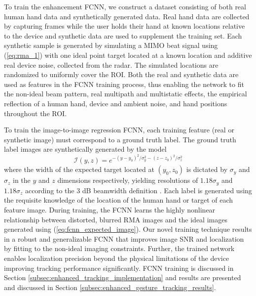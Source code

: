 \documentclass[10pt,journal,final]{IEEEtran}
\begin{document}
To train the enhancement FCNN, we construct a dataset consisting of both real human hand data and synthetically generated data.
Real hand data are collected by capturing frames while the user holds their hand at known locations relative to the device and synthetic data are used to supplement the training set. 
Each synthetic sample is generated by simulating a MIMO beat signal using (\ref{eq:rma_1}) with one ideal point target located at a known location and additive real device noise, collected from the radar. 
The simulated locations are randomized to uniformly cover the ROI.
Both the real and synthetic data are used as features in the FCNN training process, thus enabling the network to fit the non-ideal beam pattern, real multipath and multistatic effects, the empirical reflection of a human hand, device and ambient noise, and hand positions throughout the ROI. 

To train the image-to-image regression FCNN, each training feature (real or synthetic image) must correspond to a ground truth label.
The ground truth label images are synthetically generated by the model
\begin{equation}
	\label{eq:fcnn_expected_image}
	\mathcal{I}(y,z) = e^{-(y - y_0)^2/\sigma_y^2 -(z - z_0)^2/\sigma_z^2}
\end{equation}
where the width of the expected target located at $(y_0,z_0)$ is dictated by $\sigma_y$ and $\sigma_z$ in the $y$ and $z$ dimensions respectively, yielding resolutions of $1.18\sigma_y$ and $1.18\sigma_z$ according to the $3$ dB beamwidth definition \cite{sar_cnn:direct1}. 
Each label is generated using the requisite knowledge of the location of the human hand or target of each feature image. 
During training, the FCNN learns the highly nonlinear relationship between distorted, blurred RMA images and the ideal images generated using (\ref{eq:fcnn_expected_image}).
Our novel training technique results in a robust and generalizable FCNN that improves image SNR and localization by fitting to the non-ideal imaging constraints. 
Further, the trained network enables localization precision beyond the physical limitations of the device improving tracking performance significantly.
FCNN training is discussed in Section \ref{subsec:enhanced_tracking_implementation} and results are presented and discussed in Section \ref{subsec:enhanced_gesture_tracking_results}.
\end{document}
